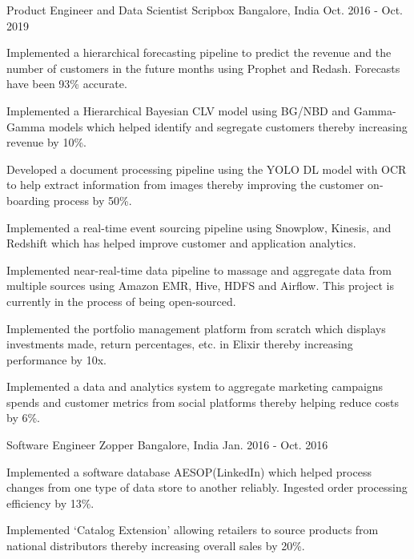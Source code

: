 \begin{cventries}
  \cventry
    {Product Engineer and Data Scientist} %
    {Scripbox} %
    {Bangalore, India} %
    {Oct. 2016 - Oct. 2019} %
    {
      \begin{cvitems} %
        \item {Implemented a hierarchical forecasting pipeline to predict the revenue and the number of customers in the future months using Prophet and Redash. Forecasts have been 93\% accurate.}
        \item {Implemented a Hierarchical Bayesian CLV model using BG/NBD and Gamma-Gamma models which helped identify and segregate customers thereby increasing revenue by 10\%.}
        \item {Developed a document processing pipeline using the YOLO DL model with OCR to help extract information from images thereby improving the customer on-boarding process by 50\%.}
        \item{Implemented a real-time event sourcing pipeline using Snowplow, Kinesis, and Redshift which has helped improve customer and application analytics.}
        \item{Implemented near-real-time data pipeline to massage and aggregate data from multiple sources using Amazon EMR, Hive, HDFS and Airflow. This project is currently in the process of being open-sourced.}
        \item{Implemented the portfolio management platform from scratch which displays investments made, return percentages, etc. in Elixir thereby increasing performance by 10x.}
        \item{Implemented a data and analytics system to aggregate marketing campaigns spends and customer metrics from social platforms thereby helping reduce costs by 6\%.}
      \end{cvitems}
    }

  \cventry
    {Software Engineer} %
    {Zopper} %
    {Bangalore, India} %
    {Jan. 2016 - Oct. 2016} %
    {
      \begin{cvitems} %
        \item {Implemented a software database AESOP(LinkedIn) which helped process changes from one type of data store to another reliably. Ingested order processing efficiency by 13\%. }
        \item {Implemented ‘Catalog Extension’ allowing retailers to source products from national distributors thereby increasing overall sales by 20\%.}
      \end{cvitems}
    }
\end{cventries}
